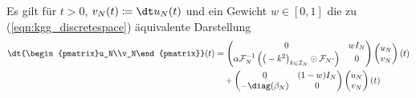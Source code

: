 Es gilt für $t>0$, $v_N(t)\coloneqq \dt u_N(t)$ und ein Gewicht $w\in [0,1]$ die zu (\ref{eqn:kgg_discretespace}) äquivalente Darstellung
\begin{align}
\label{eqn:kgg_discrete_first_order_part1}
\dt{\begin{pmatrix}u_N\\v_N\end{pmatrix}}(t)&=
\begin{pmatrix}0 & wI_N\\ \alpha\mathcal{F}_N^{-1}\left(\big(-k^2\big)_{k\in\mathcal{I}_N}\odot\mathcal{F}_N \cdot\right) & 0\end{pmatrix}
\begin{pmatrix}u_N\\v_N\end{pmatrix}(t)\\
\label{eqn:kgg_discrete_first_order_part2}
&\quad+\begin{pmatrix}0 & (1-w)I_N\\ -\diag({\beta_N}) & 0\end{pmatrix}
\begin{pmatrix}u_N\\v_N\end{pmatrix}(t)
\end{align}
